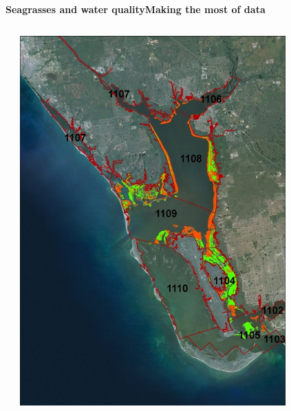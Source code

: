 \documentclass[serif]{beamer}\usepackage[]{graphicx}\usepackage[]{color}
\newenvironment{knitrout}{}{} %
\begin{document}
\begin{frame}{\textbf{Seagrasses and water quality}}{\textbf{Making the most of data}}
\begin{columns}[T]
\begin{column}{0.5\textwidth}
\begin{knitrout}
\end{knitrout}
\end{column}
\begin{column}{0.45\textwidth}
\centerline{\includegraphics[width = 0.8\textwidth]{fig/Charlotte_Estuary_Segments.jpg}}
\end{column}
\end{columns}
\end{frame}
\end{document}
